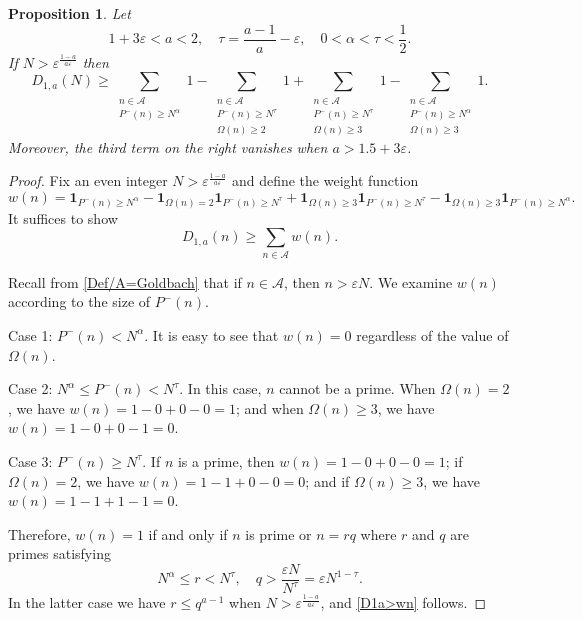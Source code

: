 \documentclass[12pt, a4paper]{amsart}
\def \P {{\mathbb P}}
\def\le{\leqslant}
\def\ge{\geqslant}
\theoremstyle{plain}
\newtheorem{proposition}{Proposition}[section]
\theoremstyle{remark}
\numberwithin{equation}{section}
\begin{document}
\begin{proposition}\label{Goldbachbasic}
Let 
$$
1+3\varepsilon<a<2,\quad \tau=\dfrac{a-1}{a}-\varepsilon, \quad 0<\alpha<\tau<\frac{1}{2}. 
$$
If $N>\varepsilon^{\frac{1-a}{a\varepsilon}}$ then 
\begin{equation}\label{D1a>}
D_{1,a}(N)\ge\sum\limits_{\substack{n\in \mathscr{A}\\P^{-}(n)\ge N^\alpha}}1
-\sum\limits_{\substack{n\in \mathscr{A}\\P^{-}(n)\ge N^\tau\\\Omega(n)\ge 2}}1
+\sum\limits_{\substack{n\in \mathscr{A}\\P^{-}(n)\ge N^\tau\\\Omega(n)\ge 3}}1
-\sum\limits_{\substack{n\in \mathscr{A}\\P^{-}(n)\ge N^\alpha\\\Omega(n)\ge 3}}1. 
\end{equation}
Moreover, the third term on the right vanishes when $a>1.5+3\varepsilon$.
\end{proposition}
	
\begin{proof} 
Fix an even integer \(N > \varepsilon^{\frac{1-a}{a\varepsilon}} \) and define the weight function  
\[
w(n)=\mathbf{1}_{P^{-}(n)\ge N^\alpha}-\mathbf{1}_{\Omega(n)=2}\mathbf{1}_{P^{-}(n)\ge N^\tau}
+\mathbf{1}_{\Omega(n)\ge 3}\mathbf{1}_{P^{-}(n)\ge N^\tau}
-\mathbf{1}_{\Omega(n)\ge 3}\mathbf{1}_{P^{-}(n)\ge N^\alpha}. 
\]
It suffices to show  
\begin{equation}\label{D1a>wn}
D_{1,a}(n)\ge\sum\limits_{n\in \mathscr{A}}w(n).
\end{equation}

Recall from \eqref{Def/A=Goldbach} that if \( n \in \mathscr{A} \), then \( n > \varepsilon N \).  
We examine \( w(n) \) according to the size of \( P^{-}(n) \). 

		Case 1: $P^{-}(n)<N^{\alpha}$.
		It is easy to see that $w(n)=0$ regardless of the value of $\Omega(n)$.
		
		Case 2: $N^{\alpha}\le P^{-}(n)<N^{\tau}$.
		In this case, $n$ cannot be a prime. When $\Omega(n)=2$, we have $w(n)=1-0+0-0=1$; and when $\Omega(n)\ge 3$, we have $w(n)=1-0+0-1=0$.
		
		Case 3: $P^{-}(n)\ge N^{\tau}$.
		If $n$ is a prime, then $w(n)=1-0+0-0=1$; if $\Omega(n)=2$, we have $w(n)=1-1+0-0=0$; and if $\Omega(n)\ge 3$, we have $w(n)=1-1+1-1=0$.

Therefore, $w(n)=1$ if and only if $n$ is prime or $n=rq$ where $r$ and $q$ are primes satisfying
$$
N^{\alpha}\le r<N^{\tau}, \quad q> \dfrac{\varepsilon N}{N^{\tau}}=\varepsilon N^{1-\tau}. 
$$
In the latter case we have
$r\le q^{a-1}$ when $N>\varepsilon^{\frac{1-a}{a\varepsilon}}$, and \eqref{D1a>wn} follows. 
\end{proof}
\end{document}
